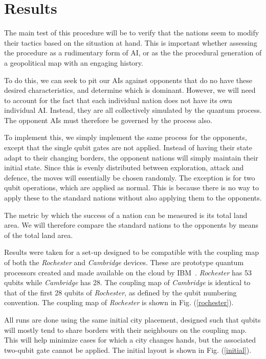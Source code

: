 \documentclass[conference]{IEEEtran}
\begin{document}
\section{Results}


The main test of this procedure will be to verify that the nations seem to modify their tactics based on the situation at hand. This is important whether assessing the procedure as a rudimentary form of AI, or as the the procedural generation of a geopolitical map with an engaging history.

To do this, we can seek to pit our AIs against opponents that do no have these desired characteristics, and determine which is dominant. However, we will need to account for the fact that each individual nation does not have its own individual AI. Instead, they are all collectively simulated by the quantum process. The opponent AIs must therefore be governed by the process also.

To implement this, we simply implement the same process for the opponents, except that the single qubit gates are not applied. Instead of having their state adapt to their changing borders, the opponent nations will simply maintain their initial state. Since this is evenly distributed between exploration, attack and defence, the moves will essentially be chosen randomly. The exception is for two qubit operations, which are applied as normal. This is because there is no way to apply these to the standard nations without also applying them to the opponents.

The metric by which the success of a nation can be measured is its total land area. We will therefore compare the standard nations to the opponents by means of the total land area.

Results were taken for a set-up designed to be compatible with the coupling map of both the \textit{Rochester} and \textit{Cambridge} devices. These are prototype quantum processors created and made available on the cloud by IBM~\cite{ibm-nisq}. \textit{Rochester} has 53 qubits while \textit{Cambridge} has 28. The coupling map of \textit{Cambridge} is identical to that of the first 28 qubits of \textit{Rochester}, as defined by the qubit numbering convention. The coupling map of \textit{Rochester} is shown in Fig. (\ref{rochester}).

All runs are done using the same initial city placement, designed such that qubits will mostly tend to share borders with their neighbours on the coupling map. This will help minimize cases for which a city changes hands, but the associated two-qubit gate cannot be applied. The initial layout is shown in Fig. (\ref{initial}).
\end{document}
